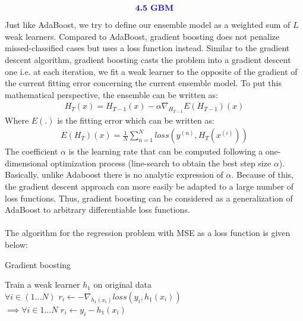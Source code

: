 \documentclass{homework}
\begin{document}
\begin{align*}
    \textcolor{blue}{ \text{{\textbf{4.5 GBM}}}}
 \end{align*}
 Just like AdaBoost, we try to define our ensemble model as a weighted sum of $L$ weak learners. Compared to AdaBoost, gradient boosting does not penalize missed-classified cases but uses a loss function instead. Similar to the gradient descent algorithm, gradient boosting casts the problem into a gradient descent one i.e. at each iteration, we fit a weak learner to the opposite of the gradient of the current fitting error concerning the current ensemble model. To put this mathematical perspective, the ensemble can be written as:
 \begin{align*}
    H_T(x) = H_{T-1}(x) - \alpha \nabla_{H_{T-1}} E(H_{T-1})(x)
 \end{align*}
 Where $E(.)$ is the fitting error which can be written as:
 \begin{align*}
    E(H_{T})(x) = \frac{1}{N} \sum_{n=1}^{N} loss(y^{(n)},H_{T}(x^{(i)}))
 \end{align*}
 The coefficient $\alpha$ is the learning rate that can be computed following a one-dimensional optimization process (line-search to obtain the best step size $\alpha$). Basically, unlike Adaboost there is no analytic expression of $\alpha$. Because of this, the gradient descent approach can more easily be adapted to a large number of loss functions. Thus, gradient boosting can be considered as a generalization of AdaBoost to arbitrary differentiable loss functions. \\
\\
 The algorithm for the regression problem with MSE as a loss function is given below:
 \begin{algorithm*}
    \caption{Gradient boosting}
    Train a weak learner $h_1$ on original data \\
    $\forall i\in(1 \dots N)$ $r_i \gets -\nabla_{h_1(x_i)}loss(y_i,h_1(x_i))$ \\
    $\implies \forall i\in{1 \dots N}$ $r_i \gets y_i - h_1(x_i)$ \\
 \end{algorithm*}
\end{document}
